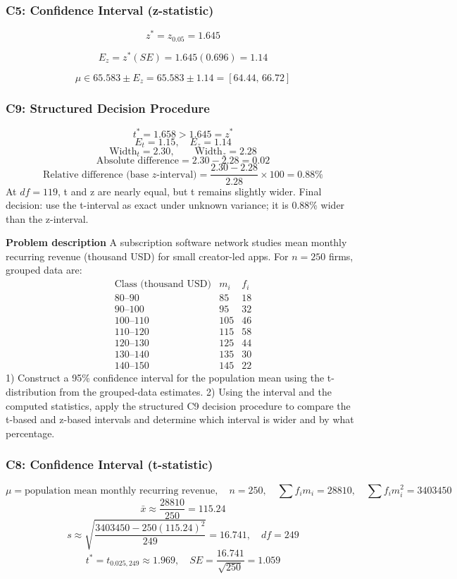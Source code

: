 \begin{ExamProblems}
		\subsubsection*{C5: Confidence Interval (z-statistic)}
		\[
		z^*=z_{0.05}=1.645
		\]

		\[
		E_z=z^*(SE)=1.645(0.696)=1.14
		\]

		\[
		\mu\in 65.583\pm E_z=65.583\pm 1.14=[64.44,\,66.72]
		\]

		\subsubsection*{C9: Structured Decision Procedure}
		\[
		t^*=1.658>1.645=z^*
		\]
		\[
		E_t=1.15,\quad E_z=1.14
		\]
		\[
		\text{Width}_t=2.30,\qquad \text{Width}_z=2.28
		\]
		\[
		\text{Absolute difference}=2.30-2.28=0.02
		\]
		\[
		\text{Relative difference (base }z\text{-interval)}=\frac{2.30-2.28}{2.28}\times 100=0.88\%
		\]
		At $df=119$, t and z are nearly equal, but t remains slightly wider.
		Final decision: use the t-interval as exact under unknown variance; it is 0.88\% wider than the z-interval.

		\newpage
		\item
		\textbf{Problem description}
		A subscription software network studies mean monthly recurring revenue (thousand USD) for small creator-led apps.
		For $n=250$ firms, grouped data are:
		\[
		\begin{array}{c|c|c}
		\text{Class (thousand USD)} & m_i & f_i\\\hline
		80\text{--}90 & 85 & 18\\
		90\text{--}100 & 95 & 32\\
		100\text{--}110 & 105 & 46\\
		110\text{--}120 & 115 & 58\\
		120\text{--}130 & 125 & 44\\
		130\text{--}140 & 135 & 30\\
		140\text{--}150 & 145 & 22
		\end{array}
		\]
		1) Construct a 95\% confidence interval for the population mean using the t-distribution from the grouped-data estimates.
		2) Using the interval and the computed statistics, apply the structured C9 decision procedure to compare the t-based and z-based intervals and determine which interval is wider and by what percentage.

		\subsubsection*{C8: Confidence Interval (t-statistic)}
		\[
		\mu=\text{population mean monthly recurring revenue},\quad n=250,\quad \sum f_im_i=28810,\quad \sum f_im_i^2=3403450
		\]
		\[
		\bar{x}\approx\frac{28810}{250}=115.24
		\]
		\[
		s\approx\sqrt{\frac{3403450-250(115.24)^2}{249}}=16.741,\quad df=249
		\]
		\[
		t^*=t_{0.025,249}\approx 1.969,\quad SE=\frac{16.741}{\sqrt{250}}=1.059
		\]


\end{ExamProblems}
